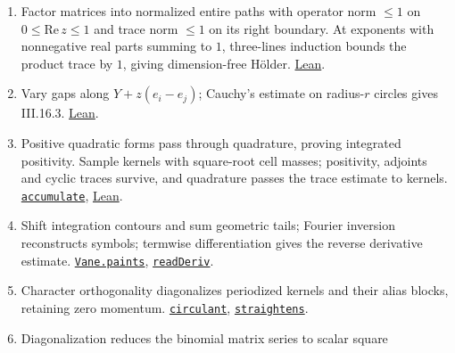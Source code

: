 \documentclass[
  letterpaper,
  11pt]{article}
\providecommand{\tightlist}{%
  \setlength{\itemsep}{0pt}\setlength{\parskip}{0pt}}
\begin{document}
\begin{enumerate}
\def\labelenumi{\arabic{enumi}.}
\tightlist
\item
  Factor matrices into normalized entire paths with operator norm
  \(\le1\) on \(0\le\mathrm{Re}\,z\le1\) and trace norm \(\le1\) on its
  right boundary. At exponents with nonnegative real parts summing to
  \(1\), three-lines induction bounds the product trace by \(1\), giving
  dimension-free Hölder.
  \href{https://github.com/yang-mills-group/OpenAI-YM-20261028/blob/3456e5e75cf8d4cd558955a5c7638fba2d68f464/YM/Complex/Holder.lean\#L73-L126}{Lean}.
\item
  Vary gaps along \(Y+z(e_i-e_j)\); Cauchy's estimate on radius-\(r\)
  circles gives III.16.3.
  \href{https://github.com/yang-mills-group/OpenAI-YM-20261028/blob/3456e5e75cf8d4cd558955a5c7638fba2d68f464/YM/Complex/Gaps.lean\#L170-L229}{Lean}.
\item
  Positive quadratic forms pass through quadrature, proving integrated
  positivity. Sample kernels with square-root cell masses; positivity,
  adjoints and cyclic traces survive, and quadrature passes the trace
  estimate to kernels.
  \href{https://github.com/yang-mills-group/OpenAI-YM-20261028/blob/3456e5e75cf8d4cd558955a5c7638fba2d68f464/YM/Analysis/Projected.lean\#L44-L70}{\texttt{accumulate}},
  \href{https://github.com/yang-mills-group/OpenAI-YM-20261028/blob/3456e5e75cf8d4cd558955a5c7638fba2d68f464/YM/TimeKernel/Trace.lean\#L109-L119}{Lean}.
\item
  Shift integration contours and sum geometric tails; Fourier inversion
  reconstructs symbols; termwise differentiation gives the reverse
  derivative estimate.
  \href{https://github.com/yang-mills-group/OpenAI-YM-20261028/blob/3456e5e75cf8d4cd558955a5c7638fba2d68f464/YM/Laurent/Art.lean\#L90-L104}{\texttt{Vane.paints}},
  \href{https://github.com/yang-mills-group/OpenAI-YM-20261028/blob/3456e5e75cf8d4cd558955a5c7638fba2d68f464/YM/Work/F07/Read.lean\#L55-L95}{\texttt{readDeriv}}.
\item
  Character orthogonality diagonalizes periodized kernels and their
  alias blocks, retaining zero momentum.
  \href{https://github.com/yang-mills-group/OpenAI-YM-20261028/blob/3456e5e75cf8d4cd558955a5c7638fba2d68f464/YM/CellFourier/Circulant.lean\#L88-L104}{\texttt{circulant}},
  \href{https://github.com/yang-mills-group/OpenAI-YM-20261028/blob/3456e5e75cf8d4cd558955a5c7638fba2d68f464/YM/CellFourier/Alias.lean\#L41-L53}{\texttt{straightens}}.
\item
  Diagonalization reduces the binomial matrix series to scalar square

\end{enumerate}
\end{document}
